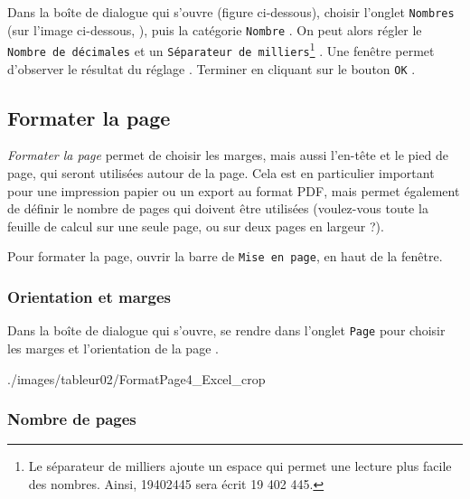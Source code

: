 Dans la boîte de dialogue qui s'ouvre (figure ci-dessous), choisir l'onglet \texttt{Nombres} (sur l'image ci-dessous, ), puis la catégorie \texttt{Nombre} . On peut alors régler le \texttt{Nombre de décimales}  et un \texttt{Séparateur de milliers}\footnote{Le séparateur de milliers ajoute un espace qui permet une lecture plus facile des nombres. Ainsi, 19402445 sera écrit 19 402 445.} . Une fenêtre permet d'observer le résultat du réglage . Terminer en cliquant sur le bouton \texttt{OK} .              




\subsection{Formater la page}\label{Calc2FormaterPage} 

\emph{Formater la page} permet de choisir les marges, mais aussi l'en-tête et le pied de page, qui seront utilisées autour de la page. Cela est en particulier important pour une impression papier ou un export au format PDF, mais permet également de définir le nombre de pages qui doivent être utilisées (voulez-vous toute la feuille de calcul sur une seule page, ou sur deux pages en largeur ?).

\vspace{12pt}

Pour formater la page, ouvrir la barre de \texttt{Mise en page}, en haut de la fenêtre. 




\subsubsection{Orientation et marges}  

Dans la boîte de dialogue qui s'ouvre, se rendre dans l'onglet \texttt{Page} pour choisir les marges  et l'orientation de la page .

%
                {./images/tableur02/FormatPage4_Excel_crop}{\textwidth}  


\subsubsection{Nombre de pages}

